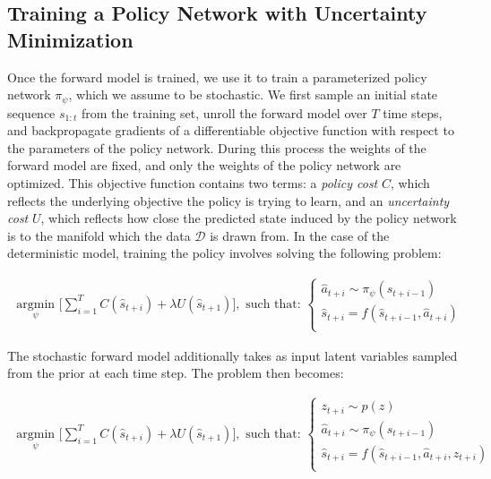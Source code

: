 \documentclass{article} %
\begin{document}

\subsection{Training a Policy Network with Uncertainty Minimization}
\label{uncertainty-minimization}

Once the forward model is trained, we use it to train a parameterized policy network $\pi_\psi$, which we assume to be stochastic.
We first sample an initial state sequence $s_{1:t}$ from the training set, unroll the forward model over $T$ time steps, and backpropagate gradients of a differentiable objective function with respect to the parameters of the policy network.
During this process the weights of the forward model are fixed, and only the weights of the policy network are optimized.
This objective function contains two terms: a \textit{policy cost} $C$, which reflects the underlying objective the policy is trying to learn, and an \textit{uncertainty cost} $U$, which reflects how close the predicted state induced by the policy network is to the manifold which the data $\mathcal{D}$ is drawn from.
In the case of the deterministic model, training the policy involves solving the following problem:


    \begin{align*}
    \underset{\psi}{\mbox{ argmin }} \Big[ \sum_{i=1}^{T} C(\hat{s}_{t+i}) + \lambda U(\hat{s}_{t+1}) \Big],  \mbox{ such that: }
    \begin{cases}
      \hat{a}_{t+i} \sim \pi_\psi(s_{t+i-1}) \\
      \hat{s}_{t+i} = f(\hat{s}_{t+i-1}, \hat{a}_{t+i}) \\
      \end{cases}
    \end{align*}

    The stochastic forward model additionally takes as input latent variables sampled from the prior at each time step. The problem then becomes:
    
        \begin{align*}
    \underset{\psi}{\mbox{ argmin }} \Big[ \sum_{i=1}^{T} C(\hat{s}_{t+i}) + \lambda U(\hat{s}_{t+1}) \Big],  \mbox{ such that: }
    \begin{cases}
      z_{t+i} \sim p(z) \\
      \hat{a}_{t+i} \sim \pi_\psi(s_{t+i-1}) \\
      \hat{s}_{t+i} = f(\hat{s}_{t+i-1}, \hat{a}_{t+i}, z_{t+i}) \\
      \end{cases}
    \end{align*}
\end{document}
